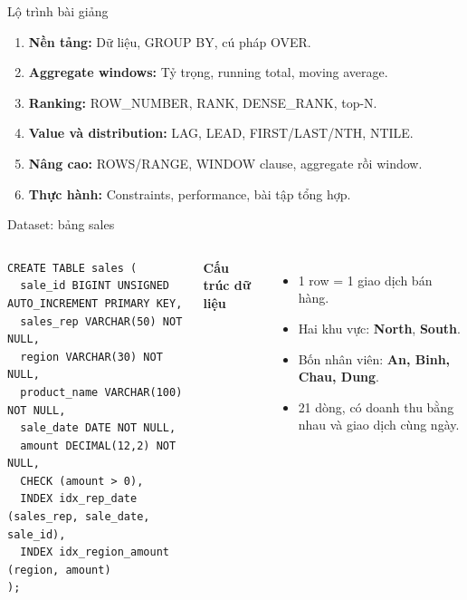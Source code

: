 \documentclass[aspectratio=169,11pt]{beamer}
\begin{document}
\begin{frame}[fragile]{Lộ trình bài giảng}

\begin{enumerate}
\setlength{\itemsep}{0.55em}
\item \textbf{Nền tảng:} Dữ liệu, GROUP BY, cú pháp OVER.
\item \textbf{Aggregate windows:} Tỷ trọng, running total, moving average.
\item \textbf{Ranking:} ROW\_NUMBER, RANK, DENSE\_RANK, top-N.
\item \textbf{Value và distribution:} LAG, LEAD, FIRST/LAST/NTH, NTILE.
\item \textbf{Nâng cao:} ROWS/RANGE, WINDOW clause, aggregate rồi window.
\item \textbf{Thực hành:} Constraints, performance, bài tập tổng hợp.
\end{enumerate}

\end{frame}

\begin{frame}[fragile]{Dataset: bảng sales}
\begin{columns}[T,onlytextwidth]
\begin{lstlisting}[basicstyle=\ttfamily\fontsize{7.6}{8.799999999999999}\selectfont]
CREATE TABLE sales (
  sale_id BIGINT UNSIGNED AUTO_INCREMENT PRIMARY KEY,
  sales_rep VARCHAR(50) NOT NULL,
  region VARCHAR(30) NOT NULL,
  product_name VARCHAR(100) NOT NULL,
  sale_date DATE NOT NULL,
  amount DECIMAL(12,2) NOT NULL,
  CHECK (amount > 0),
  INDEX idx_rep_date (sales_rep, sale_date, sale_id),
  INDEX idx_region_amount (region, amount)
);
\end{lstlisting}

\textbf{Cấu trúc dữ liệu}\par
\vspace{0.3em}
\begin{itemize}
\item 1 row = 1 giao dịch bán hàng.
\item Hai khu vực: \textbf{North}, \textbf{South}.
\item Bốn nhân viên: \textbf{An, Binh, Chau, Dung}.
\item 21 dòng, có doanh thu bằng nhau và giao dịch cùng ngày.
\end{itemize}

\end{columns}
\end{frame}
\end{document}
